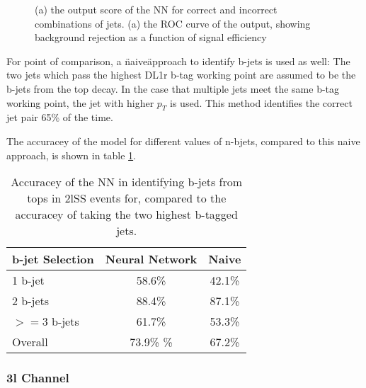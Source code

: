 \begin{figure}[h!]
  \label{fig:top2lSSresults}
  \caption{(a) the output score of the NN for correct and incorrect combinations of jets. (a) the ROC curve of the output, showing background rejection as a function of signal efficiency}
\end{figure}

For point of comparison, a \"naive\" approach to identify b-jets is used as well: The two jets which pass the highest DL1r b-tag working point are assumed to be the b-jets from the top decay. In the case that multiple jets meet the same b-tag working point, the jet with higher $p_T$ is used. This method identifies the correct jet pair 65\% of the time. 

The accuracey of the model for different values of n-bjets, compared to this naive approach, is shown in table \ref{tab:topMatchAcc2lSS}.

\begin{table}[h]
  \centering
  \caption{Accuracey of the NN in identifying b-jets from tops in 2lSS events for, compared to the accuracey of taking the two highest b-tagged jets.}
  \begin{tabular}{l|c|c}
    \hline\hline
    b-jet Selection & Neural Network & Naive \\
    \hline
    1 b-jet & 58.6\% & 42.1\% \\
    2 b-jets & 88.4\% & 87.1\% \\
    $>=$3 b-jets & 61.7\% & 53.3\% \\
    \hline
    Overall & 73.9\% \% & 67.2\% \\                                                                                  
    \hline                                                                                                 
  \end{tabular}
  \label{tab:topMatchAcc2lSS}                                                                                           
\end{table}

\subsubsection{3l Channel}
\label{subsec:top3l}
 
